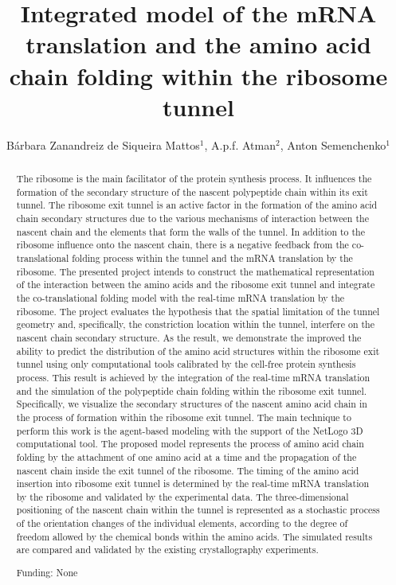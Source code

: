 \documentclass[twoside]{article}
\title{\vspace{-15mm}\fontsize{24pt}{10pt}\selectfont\textbf{Integrated model of the mRNA translation and the amino acid chain folding within the ribosome tunnel}} %
\author{B\'arbara Zanandreiz de Siqueira Mattos$^1$, A.p.f. Atman$^2$, Anton Semenchenko$^1$}
\affil{1 CENTRO UNIVERSIT\'ARIO NEWTON PAIVA\\ 2 CEFETMG\\ }
\date{}
\begin{document}
\maketitle %

\thispagestyle{fancy} %


\begin{abstract}
The ribosome is the main facilitator of the protein synthesis process. It influences the formation of the secondary structure of the nascent polypeptide chain within its exit tunnel. The ribosome exit tunnel is an active factor in the formation of the amino acid chain secondary structures due to the various mechanisms of interaction between the nascent chain and the elements that form the walls of the tunnel. In addition to the ribosome influence onto the nascent chain, there is a negative feedback from the co-translational folding process within the tunnel and the mRNA translation by the ribosome. The presented project intends to construct the mathematical representation of the interaction between the amino acids and the ribosome exit tunnel and integrate the co-translational folding model with the real-time mRNA translation by the ribosome. The project evaluates the hypothesis that the spatial limitation of the tunnel geometry and, specifically, the constriction location within the tunnel, interfere on the nascent chain secondary structure. As the result, we demonstrate the improved the ability to predict the distribution of the amino acid structures within the ribosome exit tunnel using only computational tools calibrated by the cell-free protein synthesis process. This result is achieved by the integration of the real-time mRNA translation and the simulation of the polypeptide chain folding within the ribosome exit tunnel. Specifically, we visualize the secondary structures of the nascent amino acid chain in the process of formation within the ribosome exit tunnel. The main technique to perform this work is the agent-based modeling with the support of the NetLogo\textsuperscript{\textcopyright} 3D computational tool. The proposed model represents the process of amino acid chain folding by the attachment of one amino acid at a time and the propagation of the nascent chain inside the exit tunnel of the ribosome. The timing of the amino acid insertion into ribosome exit tunnel is determined by the real-time mRNA translation by the ribosome and validated by the experimental data. The three-dimensional positioning of the nascent chain within the tunnel is represented as a stochastic process of the orientation changes of the individual elements, according to the degree of freedom allowed by the chemical bonds within the amino acids. The simulated results are compared and validated by the existing crystallography experiments.

Funding: None
\end{abstract}
\end{document}
